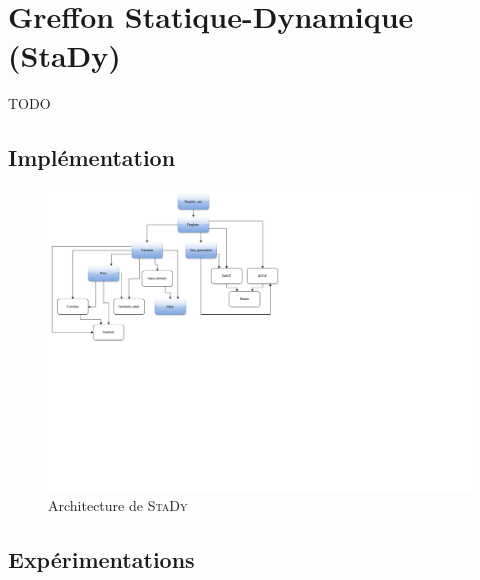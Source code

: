 
\chapter{Greffon Statique-Dynamique (StaDy)}
\label{sec:stady}

\chapterintro

TODO


\section{Implémentation}


\begin{center}
  \begin{figure}
    \includegraphics[scale=.5]{figures/stady_architecture.pdf}
    \vspace{-11cm}
    \caption{Architecture de \textsc{StaDy}
      \label{fig:stady-architecture}}
  \end{figure}
\end{center}


\section{Expérimentations}


